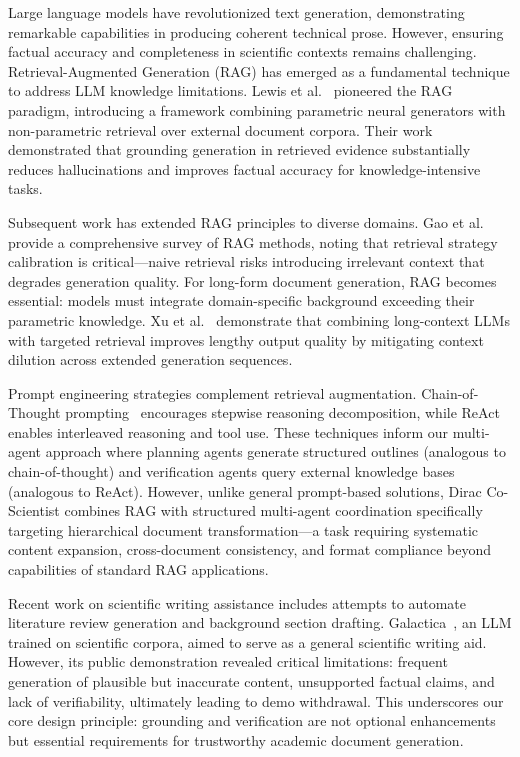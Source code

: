 \documentclass{ieeeaccess}
\begin{document}
Large language models have revolutionized text generation, demonstrating remarkable capabilities in producing coherent technical prose. However, ensuring factual accuracy and completeness in scientific contexts remains challenging. Retrieval-Augmented Generation (RAG) has emerged as a fundamental technique to address LLM knowledge limitations. Lewis et al.~\cite{lewis2020rag} pioneered the RAG paradigm, introducing a framework combining parametric neural generators with non-parametric retrieval over external document corpora. Their work demonstrated that grounding generation in retrieved evidence substantially reduces hallucinations and improves factual accuracy for knowledge-intensive tasks.

Subsequent work has extended RAG principles to diverse domains. Gao et al.~\cite{gao2023rag} provide a comprehensive survey of RAG methods, noting that retrieval strategy calibration is critical—naive retrieval risks introducing irrelevant context that degrades generation quality. For long-form document generation, RAG becomes essential: models must integrate domain-specific background exceeding their parametric knowledge. Xu et al.~\cite{xu2024retrieval} demonstrate that combining long-context LLMs with targeted retrieval improves lengthy output quality by mitigating context dilution across extended generation sequences.

Prompt engineering strategies complement retrieval augmentation. Chain-of-Thought prompting~\cite{wei2022chain} encourages stepwise reasoning decomposition, while ReAct~\cite{yao2022react} enables interleaved reasoning and tool use. These techniques inform our multi-agent approach where planning agents generate structured outlines (analogous to chain-of-thought) and verification agents query external knowledge bases (analogous to ReAct). However, unlike general prompt-based solutions, Dirac Co-Scientist combines RAG with structured multi-agent coordination specifically targeting hierarchical document transformation—a task requiring systematic content expansion, cross-document consistency, and format compliance beyond capabilities of standard RAG applications.

Recent work on scientific writing assistance includes attempts to automate literature review generation and background section drafting. Galactica~\cite{taylor2022galactica}, an LLM trained on scientific corpora, aimed to serve as a general scientific writing aid. However, its public demonstration revealed critical limitations: frequent generation of plausible but inaccurate content, unsupported factual claims, and lack of verifiability, ultimately leading to demo withdrawal. This underscores our core design principle: grounding and verification are not optional enhancements but essential requirements for trustworthy academic document generation.
\end{document}
